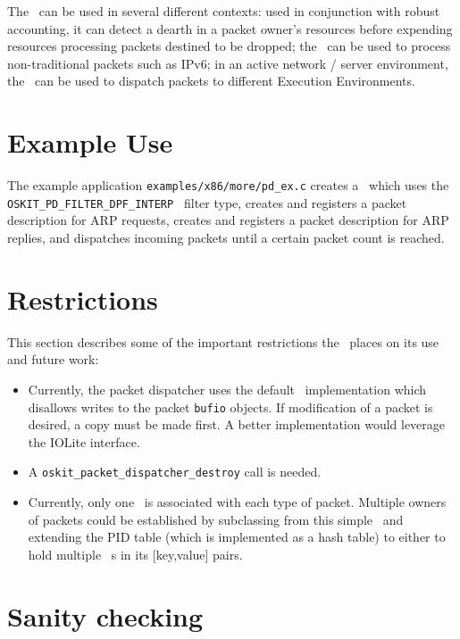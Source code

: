 The \pd\ can be used in several different contexts:
used in conjunction with robust accounting, 
it can detect a dearth in a packet owner's resources
before expending resources processing packets destined
to be dropped;
the \pd\ can be used to process non-traditional
packets such as IPv6; in an active network / server
environment, the \pd\ can be used to dispatch packets
to different Execution Environments. 

\section{Example Use}

The example application {\tt examples/x86/more/pd_ex.c} creates a \pd\
which uses the \\
{\tt OSKIT_PD_FILTER_DPF_INTERP } filter type, creates and
registers a packet description for ARP requests, creates and registers
a packet description for ARP replies, and dispatches incoming packets
until a certain packet count is reached.

\section{Restrictions}

This section describes some of the important restrictions
the \pd\ places on its use and future work:

\begin{itemize}
\item{
	Currently, the packet dispatcher uses the default \netio\ 
	implementation which disallows writes to the packet {\tt bufio}
	objects. If modification of a packet is desired, a copy
	must be made first. A better implementation would
	leverage the \oskit{} IOLite interface.
}
\item{
	A {\tt oskit_packet_dispatcher_destroy} 
	call is needed.
}
\item{
	Currently, only one \netio\ is associated with each
	type of packet. Multiple owners of packets could be established 
	by subclassing from this simple \pd\ and
	extending the PID table (which is implemented as a hash
	table) to either to hold multiple \netio~s in its
	[key,value] pairs. 
}
\end{itemize}

\section{Sanity checking}

